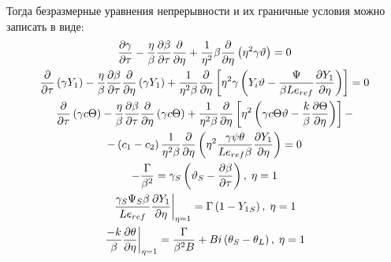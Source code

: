 Тогда безразмерные уравнения непрерывности и их граничные условия можно записать в виде:
\begin{gather}
 \frac{\partial \gamma }{\partial \tau }- \frac{\eta }{\beta }\frac{\partial \beta }{\partial \tau }\frac{\partial }{\partial \eta } +\frac{1}{{\eta}^{2}}\beta \frac{\partial }{\partial \eta }\left({\eta}^{2}\gamma \vartheta \right)=0\label{eq:math_continuity_dim}\\
 \frac{\partial }{\partial \tau }\left({\gamma }{Y}_{1}\right)-\frac{\eta}{\beta }\frac{\partial \beta }{\partial \tau }\frac{\partial }{\partial \eta }\left(\gamma {Y}_{1}\right)+\frac{1}{{\eta }^{2}\beta }\frac{\partial }{\partial \eta }\left[{\eta }^{2}\gamma \left({Y}_{i}\vartheta-   \frac{\Psi }{\beta L{e}_{ref}}\frac{\partial {Y}_{1}}{\partial \eta}\right)\right]=0 \\
 \frac{\partial }{\partial \tau }\left({\gamma }c\Theta\right)-\frac{\eta}{\beta }\frac{\partial \beta }{\partial \tau }\frac{\partial }{\partial \eta }\left(\gamma c\Theta\right)+\frac{1}{{\eta }^{2}\beta }\frac{\partial }{\partial \eta }\left[{\eta }^{2}\left(\gamma c\Theta \vartheta- \frac{k }{\beta }\frac{\partial \Theta}{\partial \eta}\right)\right]-\notag\\ -\left({c}_{1}-{c}_{2}\right)\frac{1}{{\eta }^{2}\beta }\frac{\partial }{\partial \eta }\left({\eta }^{2}\frac{\gamma \psi \theta }{Le_{ref}\beta }\frac{\partial {Y}_{1}}{\partial \eta }\right) =0  \\
 -\frac{\Gamma }{{\beta }^{2}}={\gamma }_{S}\left({\vartheta }_{S}-\frac{\partial \beta }{\partial \tau }\right), \; \eta =1 \\
 \left.\frac{{\gamma }_{S}{\Psi }_{S}\beta }{L{e}_{ref}}{\frac{\partial {Y}_{1}}{\partial \eta }}\right\vert_{\eta =1}=\Gamma\left(1-{Y_1}_{S}\right), \;\eta =1 \\
 \left.\frac{-k}{\beta }{\frac{\partial \theta }{\partial \eta }}\right\vert_{\eta =1}=\frac{\Gamma }{{\beta }^{2}B}+{Bi}\left({\theta }_{S}-{\theta}_{L}\right), \;\eta =1\label{eq:math_boundary3_dim} 
\end{gather}

